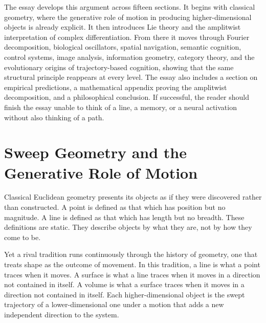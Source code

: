 \documentclass[11pt, a4paper]{article}
\theoremstyle{plain}
\theoremstyle{definition}
\theoremstyle{remark}
\begin{document}
The essay develops this argument across fifteen sections. It begins with classical
geometry, where the generative role of motion in producing higher-dimensional objects
is already explicit. It then introduces Lie theory and the amplitwist interpretation of
complex differentiation. From there it moves through Fourier decomposition, biological
oscillators, spatial navigation, semantic cognition, control systems, image analysis,
information geometry, category theory, and the evolutionary origins of trajectory-based
cognition, showing that the same structural principle reappears at every level. The
essay also includes a section on empirical predictions, a mathematical appendix proving
the amplitwist decomposition, and a philosophical conclusion. If successful, the reader
should finish the essay unable to think of a line, a memory, or a neural activation
without also thinking of a path.


\section{Sweep Geometry and the Generative Role of Motion}

Classical Euclidean geometry presents its objects as if they were discovered rather
than constructed. A point is defined as that which has position but no magnitude.
A line is defined as that which has length but no breadth. These definitions are static.
They describe objects by what they are, not by how they come to be.

Yet a rival tradition runs continuously through the history of geometry, one that treats
shape as the outcome of movement. In this tradition, a line is what a point traces when
it moves. A surface is what a line traces when it moves in a direction not contained in
itself. A volume is what a surface traces when it moves in a direction not contained in
itself. Each higher-dimensional object is the swept trajectory of a lower-dimensional one
under a motion that adds a new independent direction to the system.
\end{document}
